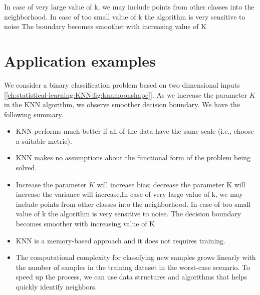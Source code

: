 \begin{refsection}
In case of very large value of k, we may include points from other classes into the neighborhood.
In case of too small value of k the algorithm is very sensitive to noise
The boundary becomes smoother with increasing value of K

\section{Application examples}

We consider a binary classification problem based on two-dimensional inputs [\autoref{ch:statistical-learning:KNN:fig:knnmoonshape}]. As we increase the parameter $K$ in the KNN algorithm, we observe smoother decision boundary. We have the following summary. 

\begin{remark}\hfill
	\begin{itemize}
		\item KNN performs much better if all of the data have the same scale (i.e., choose a suitable metric).
		\item KNN makes no assumptions about the functional form of the problem being solved.
		\item Increase the parameter $K$ will increase bias; decrease the parameter K will increase the variance will increase.In case of very large value of k, we may include points from other classes into the neighborhood.
		In case of too small value of k the algorithm is very sensitive to noise.
		The decision boundary becomes smoother with increasing value of K
		
		
		\item KNN is a memory-based approach and it does not requires training.
		\item The computational complexity for classifying new samples grows linearly with the number of samples in the training dataset in the worst-case scenario. To speed up the process, we can use data structures and algorithms that helps quickly identify neighbors.
		
		
	\end{itemize}
\end{remark}



\end{refsection}
